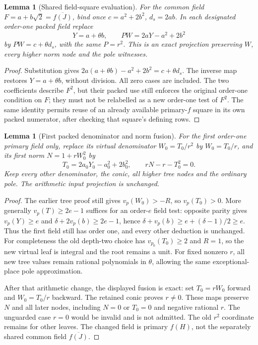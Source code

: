 \documentclass[11pt]{article}
\newtheorem{lemma}[theorem]{Lemma}
\theoremstyle{definition}
\theoremstyle{remark}
\begin{document}
\begin{lemma}[Shared field-square evaluation]
\label{lem:quartic-shared-field-square}
For the common field $F=a+b\sqrt2=\overline{f(J)}$, bind once
$c=a^2+2b^2$, $d_s=2ab$. In each designated order-one packed field replace
\[
 Y=a+\theta b,\qquad PW=2aY-a^2+2b^2
\]
by $PW=c+\theta d_s$, with the same $P=r^2$. This is an exact projection
preserving $W$, every higher norm node and the pole witnesses.
\end{lemma}
\begin{proof}
Substitution gives $2a(a+\theta b)-a^2+2b^2=c+\theta d_s$.
The inverse map restores $Y=a+\theta b$, without division. All zero
cases are included. The two coefficients describe $F^2$, but their
packed use still enforces the original order-one condition on $F$;
they must not be relabelled as a new order-one test of $F^2$. The same
identity permits reuse of an already available primary-$f$ square in
its own packed numerator, after checking that square's defining rows.
\end{proof}



\begin{lemma}[First packed denominator and norm fusion]
\label{lem:quartic-first-norm-fusion}
For the first order-one primary field only, replace its virtual denominator
$W_0=T_0/r^2$ by $W_0=T_0/r$, and its first norm $N=1+rW_0^2$ by
\[
 T_0=2a_0Y_0-a_0^2+2b_0^2,\qquad rN-r-T_0^2=0.
\]
Keep every other denominator, the conic, all higher tree nodes and the
ordinary pole. The arithmetic input projection is unchanged.
\end{lemma}
\begin{proof}
The earlier tree proof still gives $v_p(W_0)>-R$, so $v_p(T_0)>0$.
More generally $v_p(T)\ge2e-1$ suffices for an order-$e$ field test:
opposite parity gives $v_p(Y)\ge e$ and
$\delta+2v_p(b)\ge2e-1$, hence
$\delta+v_p(b)\ge e+(\delta-1)/2\ge e$.
Thus the first field still has order one, and every other deduction is
unchanged. For completeness the old depth-two choice has $v_{p_0}(T_0)\ge2$
and $R=1$, so the new virtual leaf is integral and the root remains a unit.
For fixed nonzero $r$, all new tree values remain rational polynomials in
$\theta$, allowing the same exceptional-place pole approximation.

After that arithmetic change, the displayed fusion is exact: set
$T_0=rW_0$ forward and $W_0=T_0/r$ backward. The retained conic proves
$r\ne0$. These maps preserve $N$ and all later nodes, including $N=0$
or $T_0=0$ and negative rational $r$. The unguarded case $r=0$ would be
invalid and is not admitted. The old $r^2$ coordinate remains for other
leaves. The changed field is primary $f(H)$, not the separately shared
common field $\overline{f(J)}$.
\end{proof}
\end{document}
